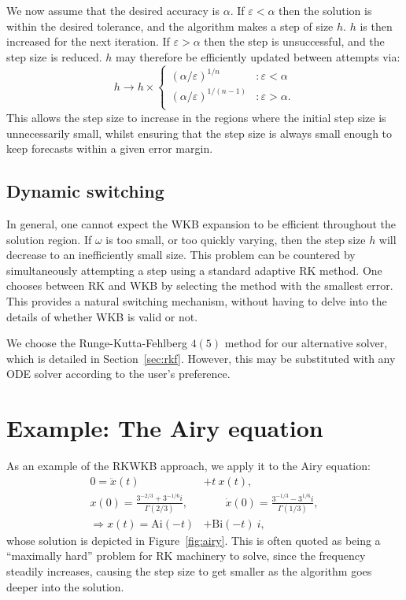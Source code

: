 We now assume that the desired accuracy is \(\alpha\). If \(\varepsilon<\alpha\) then the solution is within the desired tolerance, and the algorithm makes a step of size \(h\). \(h\) is then increased for the next iteration. If \(\varepsilon>\alpha\) then the step is unsuccessful, and the step size is reduced. \(h\) may therefore be efficiently updated between attempts via:
\begin{equation}
  h \to h\times\left\{
  \begin{array}{lr}
    {(\alpha/\varepsilon)}^{1/n} &: \varepsilon<\alpha \\
    {(\alpha/\varepsilon)}^{1/(n-1)} &: \varepsilon>\alpha. \\
  \end{array}
  \right.\label{eqn:h_update}
\end{equation}
This allows the step size to increase in the regions where the initial step size is unnecessarily small, whilst ensuring that the step size is always small enough to keep forecasts within a given error margin.

\subsection{Dynamic switching}
In general, one cannot expect the WKB expansion to be efficient throughout the solution region. If \(\omega\) is too small, or too quickly varying, then the step size \(h\) will decrease to an inefficiently small size. This problem can be countered by simultaneously attempting a step using a standard adaptive RK method. One chooses between RK and WKB by selecting the method with the smallest error. This provides a natural switching mechanism, without having to delve into the details of whether WKB is valid or not.

We choose the Runge-Kutta-Fehlberg \(4(5)\) method for our alternative solver, which is detailed in Section~\ref{sec:rkf}. However, this may be substituted with any ODE solver according to the user's preference.

\section{Example: The Airy equation}


As an example of the RKWKB approach, we apply it to the Airy equation:
\begin{align}
  0=\ddot{x}(t) &+ t\: x(t) ,
  \label{eqn:airy_equation}\\
  x(0)=\frac{3^{-2/3}+3^{-1/6}i}{\Gamma(2/3)},
  &\qquad
  \dot{x}(0) = \frac{3^{-1/3}-3^{1/6}i}{\Gamma(1/3)},
  \\
  \Rightarrow x(t) = \mathrm{Ai}(-t) &+ \mathrm{Bi}(-t)\:i,
  \label{eqn:airy_solution}
\end{align}
whose solution is depicted in Figure~\ref{fig:airy}. This is often quoted as being a ``maximally hard'' problem for RK machinery to solve, since the frequency steadily increases, causing the step size to get smaller as the algorithm goes deeper into the solution.

